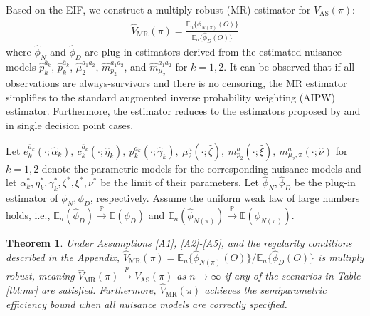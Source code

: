 \documentclass{article}
\newcommand{\wh}{\widehat}
\newcommand{\pr}{\mathbb{P}}
\newcommand{\E}{\mathbb{E}}
\newcommand{\supp}{\textrm{Appendix}}
\newtheorem{theorem}{Theorem}
\begin{document}
Based on the EIF, we construct a multiply robust (MR) estimator for $V_{\text{AS}}(\pi)$:
\begin{align} \label{Vmr}
	\wh{V}_{\text{MR}}(\pi) = \frac{\mathbb{E}_n \{ \hat{\phi}_{N(\pi)}(O) \} }{\mathbb{E}_n \{ \hat{\phi}_D(O) \} }
\end{align}
where $\hat{\phi}_N$ and $\hat{\phi}_D$ are plug-in estimators derived from the estimated nuisance models $\hat{p}_k^{\bar{a}_k}$, $\hat{p}_k^{\bar{a}_k}$, $\hat{\mu}_2^{a_1a_2}$, $\hat{m}_{p_2}^{a_1a_2}$, and $\hat{m}_{\mu_2}^{a_1a_2}$ for $k = 1, 2$. It can be observed that if all observations are always-survivors and there is no censoring, the MR estimator simplifies to the standard augmented inverse probability weighting (AIPW) estimator. 
Furthermore, the estimator reduces to the estimators proposed by \cite{ps3} and \cite{chu23c} in single decision point cases.
	
Let $e_k^{\bar a_k}(\cdot;\hat\alpha_k),~ 
	c_k^{\bar a_k}(\cdot;\hat\eta_k),~ 
	p_k^{\bar a_k}(\cdot;\hat\gamma_k),~ 
	\mu_2^{\bar a}(\cdot;\hat\zeta),~ 
	m_{p_2}^{\bar a}(\cdot;\hat\xi),~ 
	m_{\mu_2,\pi}^{\bar a}(\cdot;\hat\nu)$ for 
$k=1,2$ denote the parametric models for the corresponding nuisance models and let $\alpha_k^*, \eta_k^*, \gamma_k^*, \zeta^*, \xi^*, \nu^*$ be the limit of their parameters. 
Let $\wh\phi_N, \wh\phi_D$ be the plug-in estimator of $\phi_N, \phi_D$, respectively. Assume the uniform weak law of large numbers holds, i.e., $\E_n( \hat{\phi}_D ) \overset{\pr}{\to} \E (\phi_D)$ and $\E_n( \hat{\phi}_{N(\pi)} ) \overset{\pr}{\to} \E({\phi}_{N(\pi)})$.
	
	\begin{theorem}%
	\label{thm:3}
		Under Assumptions \ref{A1}, \ref{A2}-\ref{A5}, and the regularity conditions described in the \supp, %
		$\wh{V}_{\text{MR}}(\pi) = {\mathbb{E}_n\{ \hat{\phi}_{N(\pi)}(O) \} }/{\mathbb{E}_n\{ \hat{\phi}_D(O) \} }$ is multiply robust, meaning $\wh{V}_{\text{MR}}(\pi) \overset{p}{\to} V_{\text{AS}}(\pi)$ as $n \to \infty$ if any of the scenarios in Table \ref{tbl:mr} are satisfied. Furthermore, $\wh{V}_{\text{MR}}(\pi)$ achieves the semiparametric efficiency bound when all nuisance models are correctly specified.
	\end{theorem}
	
\end{document}
